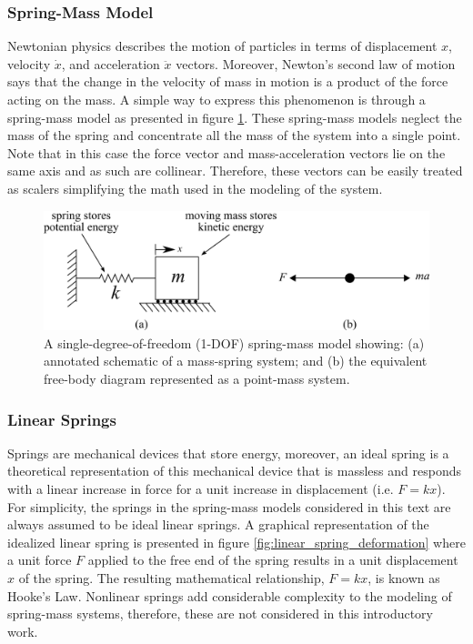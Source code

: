 \documentclass[12pt,letter]{article}
\begin{document}
		\subsubsection{Spring-Mass Model}

							
            Newtonian physics describes the motion of particles in terms of displacement $x$, velocity $\dot{x}$, and acceleration $\ddot{x}$ vectors. Moreover, Newton's second law of motion says that the change in the velocity of mass in motion is a product of the force acting on the mass. A simple way to express this phenomenon is through a spring-mass model as presented in figure  \ref{fig:spring_mass_model_with_point_mass}. These spring-mass models neglect the mass of the spring and concentrate all the mass of the system into a single point. Note that in this case the force vector and mass-acceleration vectors lie on the same axis and as such are collinear. Therefore, these vectors can be easily treated as scalers simplifying the math used in the modeling of the system.     

			\begin{figure}[H]
				\centering
				\includegraphics[]{../figures/spring_mass_model_with_point_mass.png}
				\caption{A single-degree-of-freedom (1-DOF) spring-mass model showing: (a) annotated schematic of a mass-spring system; and (b) the equivalent free-body diagram represented as a point-mass system.}
				\label{fig:spring_mass_model_with_point_mass}
			\end{figure}	
		
		\subsubsection{Linear Springs}
	
            Springs are mechanical devices that store energy, moreover, an ideal spring is a theoretical representation of this mechanical device that is massless and responds with a linear increase in force for a unit increase in displacement (i.e. $F=kx$). For simplicity, the springs in the spring-mass models considered in this text are always assumed to be ideal linear springs. A graphical representation of the idealized linear spring is presented in figure \ref{fig:linear_spring_deformation} where a unit force $F$ applied to the free end of the spring results in a unit displacement $x$ of the spring.  The resulting mathematical relationship,  $F=kx$, is known as Hooke's Law. Nonlinear springs add considerable complexity to the modeling of spring-mass systems, therefore, these are not considered in this introductory work. 
			
\end{document}
